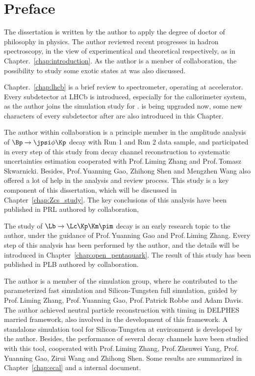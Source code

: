 \chapter{Preface}

The dissertation is written by the author to apply the degree of doctor of philosophy in physics.
The author reviewed recent progresses in hadron spectroscopy,
in the view of experimentical and theoretical respectively,
as in Chapter.~\ref{chap:introduction}.
As the author is a menber of \lhcb collaboration, 
the possibility to study some exotic states at \lhcb was also discussed.

Chapter.~\ref{chap:lhcb} is a brief review to \lhcb spectrometer,
operating at \lhc accelerator.
Every subdetector at LHCb is introduced,
especially for the callorimeter system,
as the author joins the \ecal simulation study for \upgradetwo.
\lhcb is being upgraded now,
some new characters of every subdetector after \upgradeone are also introduced in this Chapter. 


The author within \lhcb collaboration is a principle member in the amplitude analysis of $\Bp\to\jpsi\phi\Kp$ decay with Run 1 and Run 2 data sample,
and participated in every step of this study from decay channel reconstruction to systematic uncertainties estimation cooperated with Prof.\,Liming Zhang and Prof.\,Tomasz Skwarnicki.
Besides, Prof.\,Yuanning Gao, Zhihong Shen and Mengzhen Wang also offered a lot of help in the analysis and review process.
This study is a key component of this dissertation,
which will be discussed in Chapter~\ref{chap:Zcs_study}.
The key conclusions of this analysis have been published in PRL\supercite{} authored by \lhcb collaboration,

The study of $\Lb\to\Lc\Kp\Km\pim$ decay is an early research topic to the author, under the guidance of Prof.\,Yuanning Gao and Prof.\,Liming Zhang.
Every step of this analysis has been performed by the author,
and the details will be introduced in Chapter~\ref{chap:open_pentaquark}. 
The result of this study has been published in PLB\supercite{} authored by \lhcb collaboration.

The author is a member of the \ecal \upgradetwo simulation group,
where he contributed to the parameterized fast simulation and Silicon-Tungsten \ecal full simulation,
guided by Prof.\,Liming Zhang, Prof.\,Yuanning Gao, Prof.\,Patrick Robbe and Adam Davis.
The author achieved neutral particle reconstruction with timing in DELPHES married \gauss framework,
also involved in the development of this framework.
A standalone simulation tool for Silicon-Tungsten \ecal at \lhcb environment is developed by the author.
Besides,
the performance of several decay channels have been studied with this tool,
cooperated with Prof.\,Liming Zhang, Prof.\,Zhenwei Yang, Prof.\,Yuanning Gao, Zirui Wang and Zhihong Shen.
Some results are summarized in Chapter~\ref{chap:ecal} and a \lhcb internal document.

